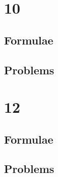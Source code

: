 \documentclass[journal]{IEEEtran}
\begin{document}
\newpage


\tableofcontents

\newpage
\onecolumn


\renewcommand{\thetable}{\theenumi}

\section{10}
\subsection{Formulae}

\subsection{Problems}


\section{12}
\subsection{Formulae}

\subsection{Problems}

\end{document}
